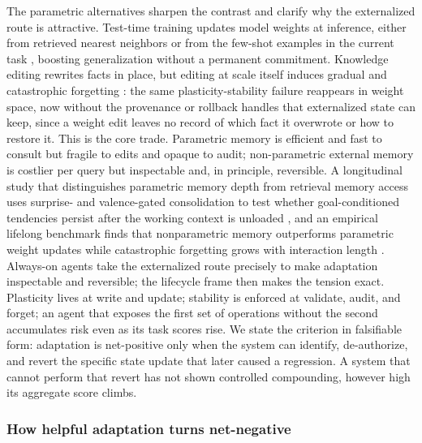 The parametric alternatives sharpen the contrast and clarify why the externalized route is attractive. Test-time training updates model weights at inference, either from retrieved nearest neighbors \citep{hardt2023tttnn} or from the few-shot examples in the current task \citep{akyurek2024ttt}, boosting generalization without a permanent commitment. Knowledge editing rewrites facts in place, but editing at scale itself induces gradual and catastrophic forgetting \citep{gupta2024editingforgetting}: the same plasticity-stability failure reappears in weight space, now without the provenance or rollback handles that externalized state can keep, since a weight edit leaves no record of which fact it overwrote or how to restore it. This is the core trade. Parametric memory is efficient and fast to consult but fragile to edits and opaque to audit; non-parametric external memory is costlier per query but inspectable and, in principle, reversible. A longitudinal study that distinguishes parametric memory depth from retrieval memory access uses surprise- and valence-gated consolidation to test whether goal-conditioned tendencies persist after the working context is unloaded \citep{han2026memorydepth}, and an empirical lifelong benchmark finds that nonparametric memory outperforms parametric weight updates while catastrophic forgetting grows with interaction length \citep{fan2025lifestatebench}. Always-on agents take the externalized route precisely to make adaptation inspectable and reversible; the lifecycle frame then makes the tension exact. Plasticity lives at write and update; stability is enforced at validate, audit, and forget; an agent that exposes the first set of operations without the second accumulates risk even as its task scores rise. We state the criterion in falsifiable form: adaptation is net-positive only when the system can identify, de-authorize, and revert the specific state update that later caused a regression. A system that cannot perform that revert has not shown controlled compounding, however high its aggregate score climbs.

\subsubsection{How helpful adaptation turns net-negative}

